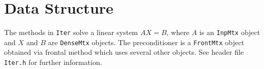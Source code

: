 \par
\section{Data Structure}
\label{section:Iter:dataStructure}
\par
\par
The methods in {\tt Iter} solve a linear system $AX=B$, where $A$ is an 
{\tt InpMtx} object and $X$ and $B$ are {\tt DenseMtx} objects.  
The preconditioner is a {\tt FrontMtx} object obtained via frontal method
which uses several other objects.  See header file {\tt Iter.h} for further
information.
